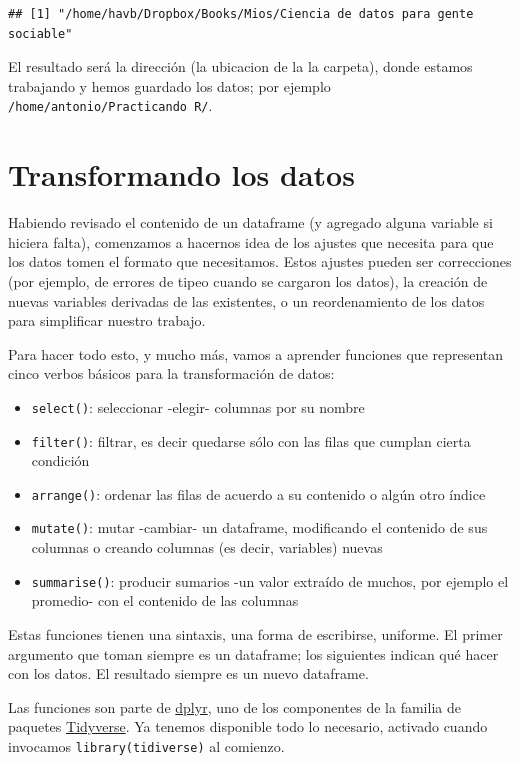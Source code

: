 \documentclass[]{book}
\providecommand{\tightlist}{%
  \setlength{\itemsep}{0pt}\setlength{\parskip}{0pt}}
\begin{document}
\begin{verbatim}
## [1] "/home/havb/Dropbox/Books/Mios/Ciencia de datos para gente sociable"
\end{verbatim}

El resultado será la dirección (la ubicacion de la la carpeta), donde
estamos trabajando y hemos guardado los datos; por ejemplo
\texttt{/home/antonio/Practicando\ R/}.

\section{Transformando los datos}\label{transformando-los-datos}

Habiendo revisado el contenido de un dataframe (y agregado alguna
variable si hiciera falta), comenzamos a hacernos idea de los ajustes
que necesita para que los datos tomen el formato que necesitamos. Estos
ajustes pueden ser correcciones (por ejemplo, de errores de tipeo cuando
se cargaron los datos), la creación de nuevas variables derivadas de las
existentes, o un reordenamiento de los datos para simplificar nuestro
trabajo.

Para hacer todo esto, y mucho más, vamos a aprender funciones que
representan cinco verbos básicos para la transformación de datos:

\begin{itemize}
\tightlist
\item
  \texttt{select()}: seleccionar -elegir- columnas por su nombre
\item
  \texttt{filter()}: filtrar, es decir quedarse sólo con las filas que
  cumplan cierta condición
\item
  \texttt{arrange()}: ordenar las filas de acuerdo a su contenido o
  algún otro índice
\item
  \texttt{mutate()}: mutar -cambiar- un dataframe, modificando el
  contenido de sus columnas o creando columnas (es decir, variables)
  nuevas
\item
  \texttt{summarise()}: producir sumarios -un valor extraído de muchos,
  por ejemplo el promedio- con el contenido de las columnas
\end{itemize}

Estas funciones tienen una sintaxis, una forma de escribirse, uniforme.
El primer argumento que toman siempre es un dataframe; los siguientes
indican qué hacer con los datos. El resultado siempre es un nuevo
dataframe.

Las funciones son parte de \href{http://dplyr.tidyverse.org/}{dplyr},
uno de los componentes de la familia de paquetes
\href{https://www.tidyverse.org/}{Tidyverse}. Ya tenemos disponible todo
lo necesario, activado cuando invocamos \texttt{library(tidiverse)} al
comienzo.
\end{document}
